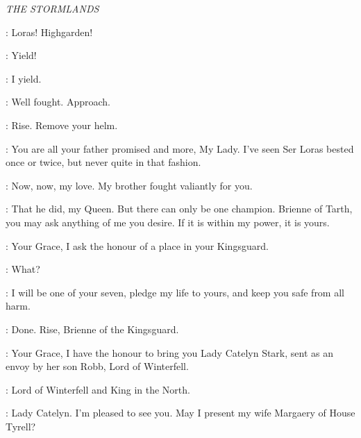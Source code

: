 \scene

\textit{THE STORMLANDS} 


\MARGAERY: Loras! Highgarden! 


\BRIENNE: Yield! 

\LORAS: I yield. 


\RENLY: Well fought. Approach. 


\RENLY: Rise. Remove your helm. 


\RENLY: You are all your father promised and more, My Lady. I've seen Ser Loras bested once or twice, but never quite in that fashion. 

\MARGAERY: Now, now, my love. My brother fought valiantly for you. 

\RENLY: That he did, my Queen. But there can only be one champion. Brienne of Tarth, you may ask anything of me you desire. If it is within my power, it is yours. 

\BRIENNE: Your Grace, I ask the honour of a place in your Kingsguard. 


\LORAS: What? 

\BRIENNE: I will be one of your seven, pledge my life to yours, and keep you safe from all harm. 

\RENLY: Done. Rise, Brienne of the Kingsguard. 


\COLEN: Your Grace, I have the honour to bring you Lady Catelyn Stark, sent as an envoy by her son Robb, Lord of Winterfell. 

\CATELYN: Lord of Winterfell and King in the North. 

\RENLY: Lady Catelyn. I'm pleased to see you. May I present my wife Margaery of House Tyrell? 

